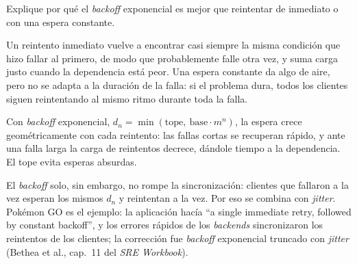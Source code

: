 \documentclass[variant=guia,cover=institutional,mode=screen]{ua-engineering-v6-article}
\begin{document}
\begin{uaexercise}
Explique por qué el \emph{backoff} exponencial es mejor que reintentar de inmediato o con una espera constante.
\end{uaexercise}
\begin{uaanswer}
Un reintento inmediato vuelve a encontrar casi siempre la misma condición que hizo fallar al primero, de modo que probablemente falle otra vez, y suma carga justo cuando la dependencia está peor. Una espera constante da algo de aire, pero no se adapta a la duración de la falla: si el problema dura, todos los clientes siguen reintentando al mismo ritmo durante toda la falla.

Con \emph{backoff} exponencial, $d_n = \min(\text{tope},\ \text{base}\cdot m^n)$, la espera crece geométricamente con cada reintento: las fallas cortas se recuperan rápido, y ante una falla larga la carga de reintentos decrece, dándole tiempo a la dependencia. El tope evita esperas absurdas.

El \emph{backoff} solo, sin embargo, no rompe la sincronización: clientes que fallaron a la vez esperan los mismos $d_n$ y reintentan a la vez. Por eso se combina con \emph{jitter}. Pokémon GO es el ejemplo: la aplicación hacía ``a single immediate retry, followed by constant backoff'', y los errores rápidos de los \emph{backends} sincronizaron los reintentos de los clientes; la corrección fue \emph{backoff} exponencial truncado con \emph{jitter} (Bethea et al., cap.~11 del \emph{SRE Workbook}).
\end{uaanswer}
\end{document}
